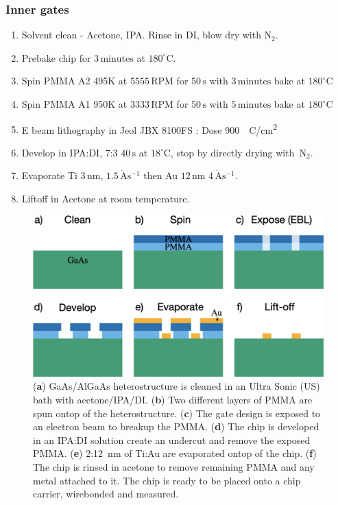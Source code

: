 \subsubsection{Inner gates}

\begin{enumerate}
\item Solvent clean - Acetone, IPA. Rinse in DI, blow dry with $\mathrm{N_2}$.
\item Prebake chip for $3\,\mathrm{minutes}$ at $180^\circ$C.
\item Spin PMMA A2 495K at $5555\,\mathrm{RPM}$ for $50\,\mathrm{s}$ with $3\,\mathrm{minutes}$ bake at $180^\circ$C
\item Spin PMMA A1 950K at $3333\,\mathrm{RPM}$ for $50\,\mathrm{s}$ with $5\,\mathrm{minutes}$ bake at $180^\circ$C
\item E beam lithography in Jeol JBX 8100FS : Dose \qty{900}{\mu C/cm^2}
\item Develop in IPA:DI, 7:3 $40\,\mathrm{s}$ at $18^\circ$C, stop by directly drying with $\,\mathrm{N_2}$.
\item Evaporate Ti $3\,\mathrm{nm}$, $1.5\,\mathrm{\dot{A}s^{-1}}$ then Au $12\,\mathrm{nm}$ $4\,\mathrm{\dot{A}s^{-1}}$.
\item Liftoff in Acetone at room temperature.
\end{enumerate}



\begin{figure}[!bht]
 \begin{center}
 \includegraphics[width=1.0\textwidth]{figures/appendix/crop_FiguresMaster.020.png}
 \caption[Step by step illustration for fabricating metal gates]{\label{fig:appx/gate_fab} 
 (\textbf{a}) GaAs/AlGaAs heterostructure is cleaned in an Ultra Sonic (US) bath with acetone/IPA/DI. 
 (\textbf{b}) Two different layers of PMMA are spun ontop of the heterostructure.
 (\textbf{c}) The gate design is exposed to an electron beam to breakup the PMMA.
 (\textbf{d}) The chip is developed in an IPA:DI solution create an undercut and remove the exposed PMMA.
 (\textbf{e}) 2:\qty{12}{nm} of Ti:Au are evaporated ontop of the chip.
 (\textbf{f}) The chip is rinsed in acetone to remove remaining PMMA and any metal attached to it. The chip is ready to be placed onto a chip carrier, wirebonded and measured.}
 \end{center}
\end{figure}



